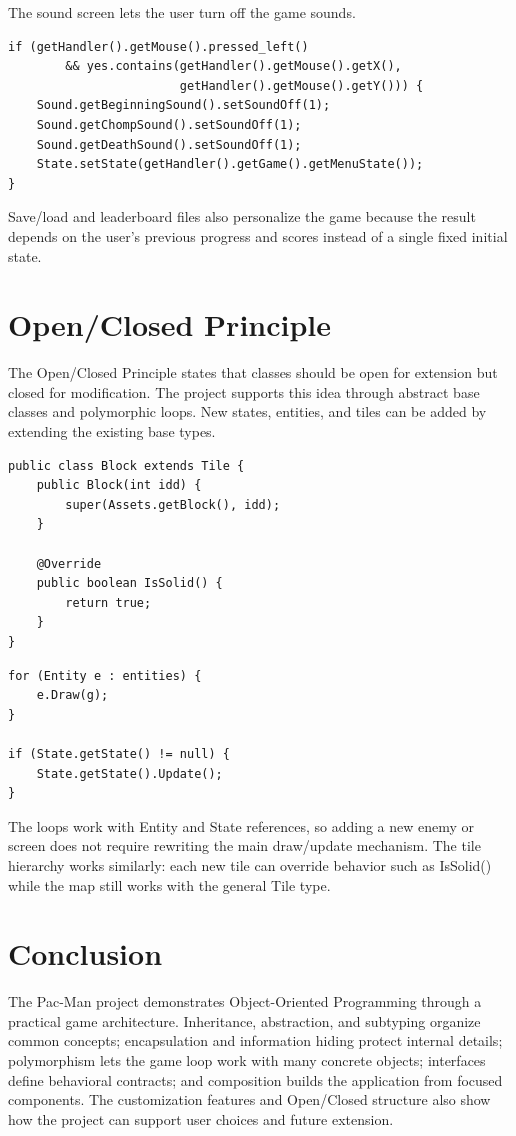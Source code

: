 \documentclass[12pt,a4paper]{article}
\begin{document}
The sound screen lets the user turn off the game sounds.

\begin{lstlisting}
if (getHandler().getMouse().pressed_left()
        && yes.contains(getHandler().getMouse().getX(),
                        getHandler().getMouse().getY())) {
    Sound.getBeginningSound().setSoundOff(1);
    Sound.getChompSound().setSoundOff(1);
    Sound.getDeathSound().setSoundOff(1);
    State.setState(getHandler().getGame().getMenuState());
}
\end{lstlisting}

Save/load and leaderboard files also personalize the game because the result depends on the user's previous progress and scores instead of a single fixed initial state.


\section*{Open/Closed Principle}
The Open/Closed Principle states that classes should be open for extension but closed for modification. The project supports this idea through abstract base classes and polymorphic loops. New states, entities, and tiles can be added by extending the existing base types.

\begin{lstlisting}
public class Block extends Tile {
    public Block(int idd) {
        super(Assets.getBlock(), idd);
    }

    @Override
    public boolean IsSolid() {
        return true;
    }
}
\end{lstlisting}

\begin{lstlisting}
for (Entity e : entities) {
    e.Draw(g);
}

if (State.getState() != null) {
    State.getState().Update();
}
\end{lstlisting}

The loops work with Entity and State references, so adding a new enemy or screen does not require rewriting the main draw/update mechanism. The tile hierarchy works similarly: each new tile can override behavior such as IsSolid() while the map still works with the general Tile type.


\section*{Conclusion}
The Pac-Man project demonstrates Object-Oriented Programming through a practical game architecture. Inheritance, abstraction, and subtyping organize common concepts; encapsulation and information hiding protect internal details; polymorphism lets the game loop work with many concrete objects; interfaces define behavioral contracts; and composition builds the application from focused components. The customization features and Open/Closed structure also show how the project can support user choices and future extension.
\end{document}
